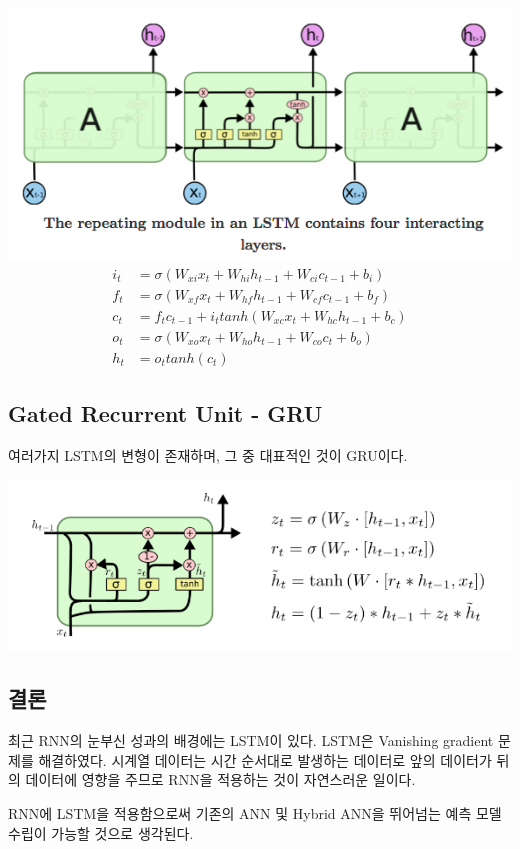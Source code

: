 \documentclass[ %
    a4paper,    %
    amsmath,    %
    itemph,     %
11pt]{oblivoir}     %
\begin{document}
\hfil\includegraphics[width=.9\textwidth]{lstm1.png}\hfil
\begin{align} 
i_t &= \sigma(W_{xi}x_t + W_{hi}h_{t-1} + W_{ci}c_{t-1} + b_i) \\
f_t &= \sigma(W_{xf}x_t + W_{hf}h_{t-1} + W_{cf}c_{t-1} + b_f) \\
c_t &= f_tc_{t-1} + i_ttanh(W_{xc}x_t + W_{hc}h_{t-1} + b_c) \\
o_t &= \sigma(W_{xo}x_t + W_{ho}h_{t-1} + W_{co}c_t + b_o) \\
h_t &= o_ttanh(c_t)
\end{align}


\subsection{Gated Recurrent Unit - GRU}
여러가지 LSTM의 변형이 존재하며, 그 중 대표적인 것이 GRU이다.

\includegraphics[width=.9\textwidth]{gru.png}


\subsection{결론}
최근 RNN의 눈부신 성과의 배경에는 LSTM이 있다. LSTM은 Vanishing gradient 문제를 해결하였다.  시계열 데이터는 시간 순서대로 발생하는 데이터로 앞의 데이터가 뒤의 데이터에 영향을 주므로 RNN을 적용하는 것이 자연스러운 일이다.

RNN에 LSTM을 적용함으로써 기존의 ANN 및 Hybrid ANN을 뛰어넘는 예측 모델 수립이 가능할 것으로 생각된다.
\end{document}
